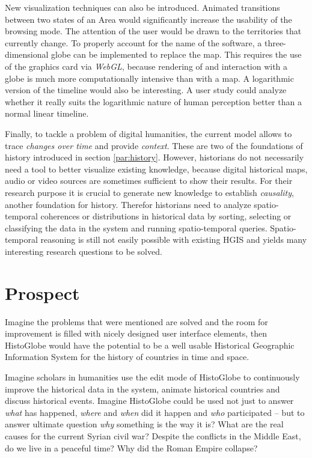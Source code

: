 New visualization techniques can also be introduced. Animated transitions between two states of an Area would significantly increase the usability of the browsing mode. The attention of the user would be drawn to the territories that currently change. To properly account for the name of the software, a three-dimensional globe can be implemented to replace the map. This requires the use of the graphics card via \emph{WebGL}, because rendering of and interaction with a globe is much more computationally intensive than with a map. A logarithmic version of the timeline would also be interesting. A user study could analyze whether it really suits the logarithmic nature of human perception better than a normal linear timeline.

Finally, to tackle a problem of digital humanities, the current model allows to trace \emph{changes over time} and provide \emph{context}. These are two of the foundations of history introduced in section \ref{par:history}. However, historians do not necessarily need a tool to better visualize existing knowledge, because digital historical maps, audio or video sources are sometimes sufficient to show their results. For their research purpose it is crucial to generate new knowledge to establish \emph{causality}, another foundation for history. Therefor historians need to analyze spatio-temporal coherences or distributions in historical data by sorting, selecting or classifying the data in the system and running spatio-temporal queries. Spatio-temporal reasoning is still not easily possible with existing HGIS and yields many interesting research questions to be solved.


\newpage
\section{Prospect} %
\label{sec:prospect}

Imagine the problems that were mentioned are solved and the room for improvement is filled with nicely designed user interface elements, then HistoGlobe would have the potential to be a well usable Historical Geographic Information System for the history of countries in time and space.

Imagine scholars in humanities use the edit mode of HistoGlobe to continuously improve the historical data in the system, animate historical countries and discuss historical events. Imagine HistoGlobe could be used not just to answer \emph{what} has happened, \emph{where} and \emph{when} did it happen and \emph{who} participated -- but to answer ultimate question \emph{why} something is the way it is?
What are the real causes for the current Syrian civil war?
Despite the conflicts in the Middle East, do we live in a peaceful time?
Why did the Roman Empire collapse?

